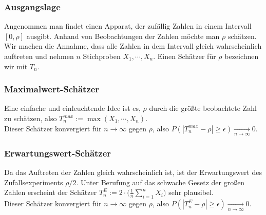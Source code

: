\documentclass[a4paper]{article}
\begin{document}
\subsubsection{Ausgangslage}
Angenommen man findet einen Apparat, der zufällig Zahlen in einem Intervall $[0, \rho]$ ausgibt. Anhand von Beobachtungen der Zahlen möchte man $\rho$ schätzen. Wir machen die Annahme, dass alle Zahlen in dem Intervall gleich wahrscheinlich auftreten und  nehmen $n$ Stichproben $X_1, \cdots, X_n$. Einen Schätzer für $\rho$ bezeichnen wir mit $T_n$.

\subsubsection{Maximalwert-Schätzer}
Eine einfache und einleuchtende Idee ist es, $\rho$ durch die größte beobachtete Zahl zu schätzen, also
$T_n^{max} := \max(X_1, \cdots, X_n)$.\\
Dieser Schätzer konvergiert für $n \to \infty$ gegen $\rho$, also $P(| T_n^{max} - \rho | \geq \epsilon) \underset{n \to \infty}{\longrightarrow} 0$.

\subsubsection{Erwartungswert-Schätzer}
Da das Auftreten der Zahlen gleich wahrscheinlich ist, ist der Erwartungswert des Zufallsexperiments $\rho /2$. Unter Berufung auf das  schwache Gesetz der großen Zahlen erscheint der Schätzer
$T_n^{E} :=  2 \cdot \biggl( \frac{1}{n} \sum_{i=1}^n X_i \biggr)$ sehr plausibel.\\
Dieser Schätzer konvergiert für $n \to \infty$ gegen $\rho$, also $P(| T_n^{E} - \rho | \geq \epsilon) \underset{n \to \infty}{\longrightarrow} 0$.
\end{document}

